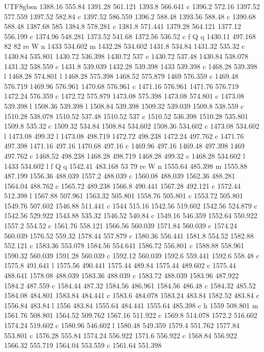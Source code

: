 \documentclass[11pt,a4paper,oneside]{report}
\begin{document}
\begin{CJK*}{UTF8}{gbsn}
{1388.16 555.84 1391.28 561.121 1393.8 566.641 c 1396.2 572.16 1397.52 577.559 1397.52 582.84 c 1397.52
586.559 1396.2 588.48 1393.56 588.48 c 1390.68 588.48 1387.68 585 1384.8 578.281 c 1381.8 571.441 1379.28
564.121 1377.12 556.199 c 1374.96 548.281 1373.52 541.68 1372.56 536.52 c f Q q 1430.11 497.168 82 82 re
W n 1433 534.602 m 1432.28 534.602 1431.8 534.84 1431.32 535.32 c 1430.84 535.801 1430.72 536.398 1430.72
537 c 1430.72 537.48 1430.84 538.078 1431.32 538.559 c 1431.8 539.039 1432.28 539.398 1433 539.398 c
1468.28 539.398 l 1468.28 574.801 l 1468.28 575.398 1468.52 575.879 1469 576.359 c 1469.48 576.719
1469.96 576.961 1470.68 576.961 c 1471.16 576.961 1471.76 576.719 1472.24 576.359 c 1472.72 575.879
1473.08 575.398 1473.08 574.801 c 1473.08 539.398 l 1508.36 539.398 l 1508.84 539.398 1509.32 539.039
1509.8 538.559 c 1510.28 538.078 1510.52 537.48 1510.52 537 c 1510.52 536.398 1510.28 535.801 1509.8
535.32 c 1509.32 534.84 1508.84 534.602 1508.36 534.602 c 1473.08 534.602 l 1473.08 499.32 l 1473.08
498.719 1472.72 498.238 1472.24 497.762 c 1471.76 497.398 1471.16 497.16 1470.68 497.16 c 1469.96 497.16
1469.48 497.398 1469 497.762 c 1468.52 498.238 1468.28 498.719 1468.28 499.32 c 1468.28 534.602 l 1433
534.602 l f Q q 1542.41 483.168 53 79 re W n 1555.64 485.398 m 1555.88 487.199 1556.36 488.039 1557.2
488.039 c 1560.08 488.039 1562.36 488.281 1564.04 488.762 c 1565.72 489.238 1566.8 490.441 1567.28
492.121 c 1572.44 512.398 l 1567.88 507.961 1563.32 505.801 1558.76 505.801 c 1553.72 505.801 1549.76
507.602 1546.88 511.441 c 1544 515.16 1542.56 519.602 1542.56 524.879 c 1542.56 529.922 1543.88 535.32
1546.52 540.84 c 1549.16 546.359 1552.64 550.922 1557.2 554.52 c 1561.76 558.121 1566.56 560.039 1571.84
560.039 c 1574.24 560.039 1576.52 559.32 1578.44 557.879 c 1580.36 556.441 1581.8 554.52 1582.88 552.121
c 1583.36 553.078 1584.56 554.641 1586.72 556.801 c 1588.88 558.961 1590.32 560.039 1591.28 560.039 c
1592.12 560.039 1592.6 559.441 1592.6 558.48 c 1575.8 491.641 l 1575.56 490.441 1575.44 489.84 1575.44
489.602 c 1575.44 488.641 1578.08 488.039 1583.36 488.039 c 1583.72 488.039 1583.96 487.922 1584.2
487.559 c 1584.44 487.32 1584.56 486.961 1584.56 486.48 c 1584.32 485.52 1584.08 484.801 1583.84 484.441
c 1583.6 484.078 1583.24 483.84 1582.52 483.84 c 1556.84 483.84 l 1556 483.84 1555.64 484.441 1555.64
485.398 c h 1559 508.801 m 1561.76 508.801 1564.52 509.762 1567.16 511.922 c 1569.8 514.078 1572.2
516.602 1574.24 519.602 c 1580.96 546.602 l 1580.48 549.359 1579.4 551.762 1577.84 553.801 c 1576.28
555.84 1574.24 556.922 1571.6 556.922 c 1568.84 556.922 1566.32 555.719 1564.04 553.559 c 1561.64 551.398
}
\end{CJK*}
\end{document}
